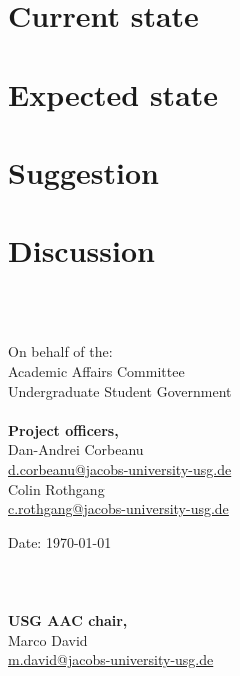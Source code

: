 \documentclass[a4paper,10pt]{article}
\makeatletter
\newcommand{\officer}[2]{#1\\\href{mailto:#2@jacobs-university-usg.de}{#2@jacobs-university-usg.de}}
\newcommand{\twoOfficer}[4]{\officer{#1}{#2}\\\officer{#3}{#4}}
\newcommand{\chair}{\officer{Marco David}{m.david}}
\makeatother
\begin{document}
	\tableofcontents
	\thispagestyle{main}
	\section{Current state}
		
	\section{Expected state}
		
  \section{Suggestion}
	  
  \section{Discussion}
	  
	  \ \\\ \\
  \begin{minipage}{0.5\textwidth}
  	\begin{flushleft}
  		On behalf of the:\\
  		Academic Affairs Committee\\
  		Undergraduate Student Government\\\ \\
  		\textbf{Project officers,}\\
  		\twoOfficer{Dan-Andrei Corbeanu}{d.corbeanu}{Colin Rothgang}{c.rothgang}
  	\end{flushleft}
  \end{minipage}
  \begin{minipage}{0.5\textwidth}
  	\begin{flushright}
  		Date: \today\\\ \\\ \\\ \\
  		\textbf{USG AAC chair,}\\
  		\chair\ \\\ \\\ \\
  	\end{flushright}
  \end{minipage}
	\label{theEnd}
\end{document}
